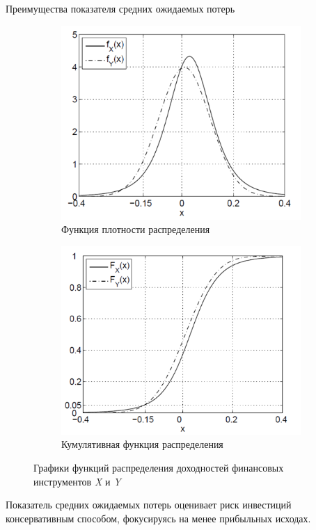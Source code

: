 \documentclass[_fin_decisions_lectures.tex]{subfiles}
\begin{document}
\begin{frame}[allowframebreaks]{Преимущества показателя средних ожидаемых потерь}
\begin{figure}	
	\centering
	\begin{subfigure}[t]{4.1cm}
		\centering
		\includegraphics[scale=0.3]{img/expected_shortfall_df.png}
	\caption{Функция плотности распределения}\label{fig:a_df}	
	\end{subfigure}
	\quad
	\begin{subfigure}[t]{4.1cm}
		\centering
		\includegraphics[scale=0.3]{img/expected_shortfall_cdfs.png}
		\caption{Кумулятивная функция распределения}\label{fig:b_cdf}
	\end{subfigure}
	\caption{Графики функций распределения доходностей финансовых инструментов \textit{X }и \textit{Y}}\label{fig:df_and_cdf}
\end{figure}
Показатель средних ожидаемых потерь оценивает риск инвестиций консервативным способом, фокусируясь на менее прибыльных исходах. 


\end{frame}
\end{document}
